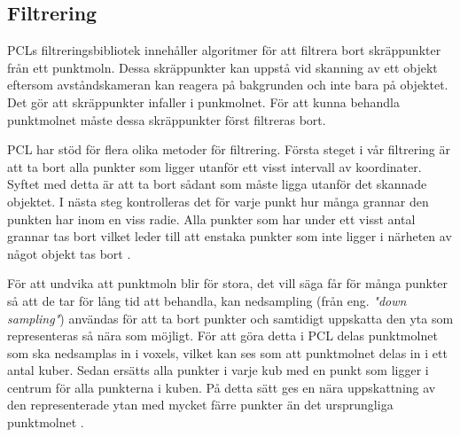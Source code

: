 


\subsection{Filtrering}
PCLs filtreringsbibliotek innehåller algoritmer för att filtrera bort skräppunkter från ett punktmoln. Dessa skräppunkter kan uppstå vid skanning av ett objekt eftersom avståndskameran kan reagera på bakgrunden och inte bara på objektet. Det gör att skräppunkter infaller i punkmolnet. För att kunna behandla punktmolnet måste dessa skräppunkter först filtreras bort.

PCL har stöd för flera olika metoder för filtrering. Första steget i vår filtrering är att ta bort alla punkter som ligger utanför ett visst intervall av koordinater. Syftet med detta är att ta bort sådant som måste ligga utanför det skannade objektet. I nästa steg kontrolleras det för varje punkt hur många grannar den punkten har inom en viss radie. Alla punkter som har under ett visst antal grannar tas bort vilket leder till att enstaka punkter som inte ligger i närheten av något objekt tas bort \cite{pcl_filtering}.

För att undvika att punktmoln blir för stora, det vill säga får för många punkter så att de tar för lång tid att behandla, kan nedsampling (från eng. \textit{"down sampling"}) användas för att ta bort punkter och samtidigt uppskatta den yta som representeras så nära som möjligt. För att göra detta i PCL delas punktmolnet som ska nedsamplas in i voxels, vilket kan ses som att punktmolnet delas in i ett antal kuber. Sedan ersätts alla punkter i varje kub med en punkt som ligger i centrum för alla punkterna i kuben. På detta sätt ges en nära uppskattning av den representerade ytan med mycket färre punkter än det ursprungliga punktmolnet \cite{voxel_grid}.
 

